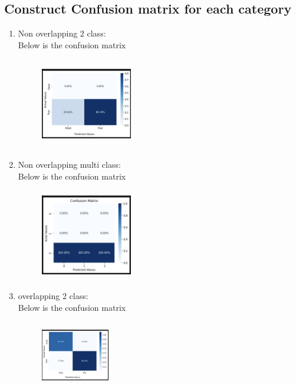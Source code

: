 \documentclass[conference]{IEEEtran}
\begin{document}
\subsection{Construct Confusion matrix for each category}
\begin{enumerate}
\item
Non overlapping 2 class: \\
Below is the confusion matrix \\
\begin{figure}[!htbp]
    \centering
    \includegraphics[width=4cm, height=4cm]{task2.21.png}
    \label{fig:my_label}
\end{figure}
\item
Non overlapping multi class: \\
Below is the confusion matrix \\
\begin{figure}[!htbp]
    \centering
    \includegraphics[width=4cm, height=4cm]{task2.22.png}
    \label{fig:my_label}
\end{figure}
\item
overlapping 2 class: \\
Below is the confusion matrix \\
\begin{figure}[!htbp]
    \centering
    \includegraphics[width=3cm, height=3cm]{task2.23.png}
    \label{fig:my_label}

\end{figure}
\end{enumerate}
\end{document}
